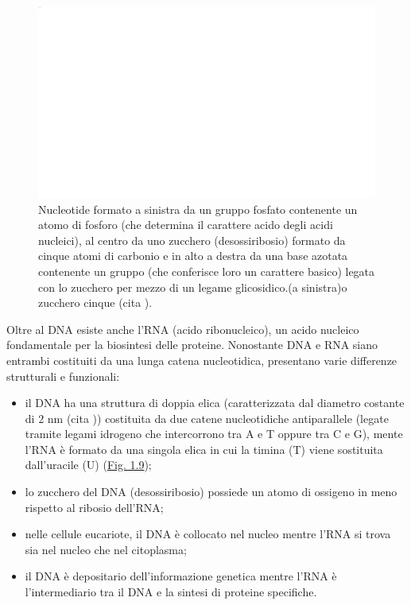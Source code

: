 \documentclass[12pt,a4paper,twoside]{report}
\begin{document}
	\begin{figure}[H]
		\centering
		\includegraphics[width=0.9\linewidth]{images/nucleotide.pdf}
		\caption{Nucleotide formato a sinistra da un gruppo fosfato contenente un atomo di fosforo  (che determina il carattere acido degli acidi nucleici), al centro da uno zucchero (desossiribosio) formato da cinque atomi di carbonio e in alto a destra da una base azotata contenente un gruppo  (che conferisce loro un carattere basico) legata con lo zucchero per mezzo di un legame glicosidico.(a sinistra)o zucchero cinque (cita
			).}
		\label{fig:nucleotide}
	\end{figure}
	
	Oltre al DNA esiste anche l'RNA (acido ribonucleico), un acido nucleico fondamentale per la biosintesi delle proteine. Nonostante DNA e RNA siano entrambi costituiti da una lunga catena nucleotidica, presentano varie differenze strutturali e funzionali:
	
	\begin{itemize}
		\item il DNA ha una struttura di doppia elica (caratterizzata dal diametro costante di $2\mbox{ nm}$ (cita
		)) costituita da due catene nucleotidiche antiparallele (legate tramite legami idrogeno che intercorrono tra A e T oppure tra C e G), mente l'RNA è formato da una singola elica in cui la timina (T) viene sostituita dall'uracile (U) (\hyperref[fig:dna_structure]{Fig. 1.9});
		\item lo zucchero del DNA (desossiribosio) possiede un atomo di ossigeno in meno rispetto al ribosio dell'RNA;
		\item nelle cellule eucariote, il DNA è collocato nel nucleo mentre l'RNA si trova sia nel nucleo che nel citoplasma;
		\item il DNA è depositario dell'informazione genetica mentre l'RNA è l'intermediario tra il DNA e la sintesi di proteine specifiche.
	\end{itemize}
	
\end{document}
